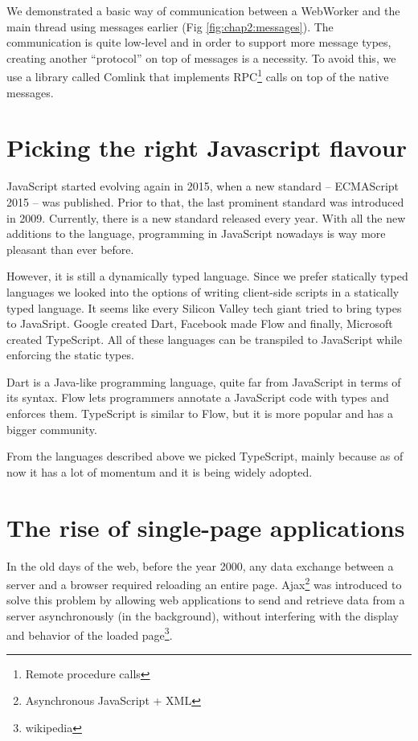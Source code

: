 We demonstrated a basic way of communication between a WebWorker and the main thread using messages earlier (Fig \ref{fig:chap2:messages}). The communication is
quite low-level and in order to support more message types, creating another ``protocol'' on top of messages is a necessity. To avoid this, we use
a library called Comlink \cite{Comlink} that implements RPC\footnote{Remote procedure calls} calls on top of the native messages.

\section{Picking the right Javascript flavour}
JavaScript started evolving again in 2015, when a new standard -- ECMAScript 2015 -- was published. Prior to that, the last prominent
standard was introduced in 2009. Currently, there is a new standard released every year. With all the new additions to the language, programming in
JavaScript nowadays is way more pleasant than ever before.

However, it is still a dynamically typed language. Since we prefer statically typed languages we looked into the options of writing client-side scripts in
a statically typed language. It seems like every Silicon Valley tech giant tried to bring types to JavaSript. Google created Dart,
Facebook made Flow and finally, Microsoft created TypeScript. All of these languages can be transpiled to JavaScript while enforcing the static types.

Dart is a Java-like programming language, quite far from JavaScript in terms of its syntax. Flow lets programmers
annotate a JavaScript code with types and enforces them. TypeScript is similar to Flow, but it is more popular and has a bigger community.

From the languages described above we picked TypeScript, mainly because as of now it has a lot of momentum and it is being widely adopted.

\section{The rise of single-page applications}
\label{chap2:spa}
In the old days of the web, before the year 2000, any data exchange between a server and a browser required reloading an entire page. 
Ajax\footnote{Asynchronous JavaScript + XML} was introduced to solve this problem by allowing web applications to send and retrieve data from
a server asynchronously (in the background), without interfering with the display and behavior of the loaded page\footnote{wikipedia}.

